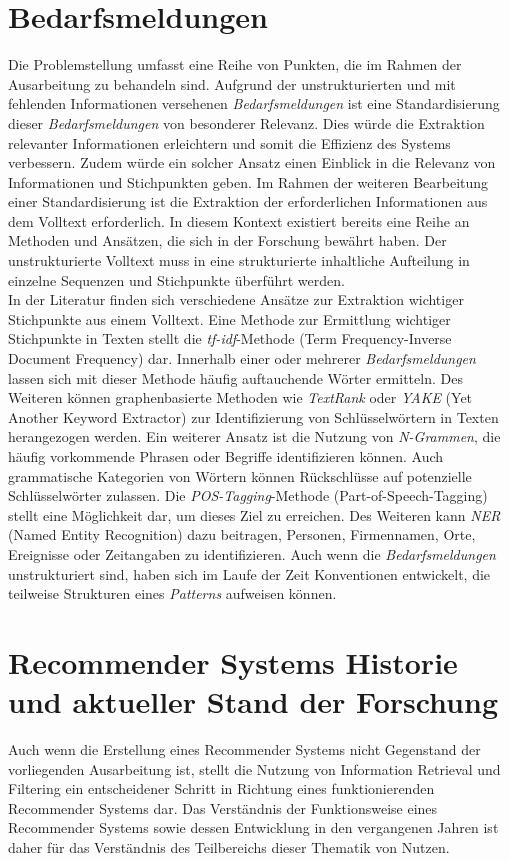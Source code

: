 \section{Bedarfsmeldungen}
Die Problemstellung umfasst eine Reihe von Punkten, die im Rahmen der Ausarbeitung zu behandeln sind. Aufgrund der unstrukturierten und mit fehlenden Informationen versehenen \emph{Bedarfsmeldungen} ist eine Standardisierung dieser \emph{Bedarfsmeldungen} von besonderer Relevanz. Dies würde die Extraktion relevanter Informationen erleichtern und somit die Effizienz des Systems verbessern. Zudem würde ein solcher Ansatz einen Einblick in die Relevanz von Informationen und Stichpunkten geben. Im Rahmen der weiteren Bearbeitung einer Standardisierung ist die Extraktion der erforderlichen Informationen aus dem Volltext erforderlich. In diesem Kontext existiert bereits eine Reihe an Methoden und Ansätzen, die sich in der Forschung bewährt haben. Der unstrukturierte Volltext muss in eine strukturierte inhaltliche Aufteilung in einzelne Sequenzen und Stichpunkte überführt werden.\\

In der Literatur finden sich verschiedene Ansätze zur Extraktion wichtiger Stichpunkte aus einem Volltext. Eine Methode zur Ermittlung wichtiger Stichpunkte in Texten stellt die \emph{tf-idf}-Methode (Term Frequency-Inverse Document Frequency) dar. Innerhalb einer oder mehrerer \emph{Bedarfsmeldungen} lassen sich mit dieser Methode häufig auftauchende Wörter ermitteln. Des Weiteren können graphenbasierte Methoden wie \emph{TextRank} oder \emph{YAKE} (Yet Another Keyword Extractor) zur Identifizierung von Schlüsselwörtern in Texten herangezogen werden. Ein weiterer Ansatz ist die Nutzung von \emph{N-Grammen}, die häufig vorkommende Phrasen oder Begriffe identifizieren können. Auch grammatische Kategorien von Wörtern können Rückschlüsse auf potenzielle Schlüsselwörter zulassen. Die \emph{POS-Tagging}-Methode (Part-of-Speech-Tagging) stellt eine Möglichkeit dar, um dieses Ziel zu erreichen. Des Weiteren kann \emph{NER} (Named Entity Recognition) dazu beitragen, Personen, Firmennamen, Orte, Ereignisse oder Zeitangaben zu identifizieren. Auch wenn die \emph{Bedarfsmeldungen} unstrukturiert sind, haben sich im Laufe der Zeit Konventionen entwickelt, die teilweise Strukturen eines \emph{Patterns} aufweisen können.

\section{Recommender Systems Historie und aktueller Stand der Forschung}
Auch wenn die Erstellung eines Recommender Systems nicht Gegenstand der vorliegenden Ausarbeitung ist, stellt die Nutzung von Information Retrieval und Filtering ein entscheidener Schritt in Richtung eines funktionierenden Recommender Systems dar. Das Verständnis der Funktionsweise eines Recommender Systems sowie dessen Entwicklung in den vergangenen Jahren ist daher für das Verständnis des Teilbereichs dieser Thematik von Nutzen.\\

